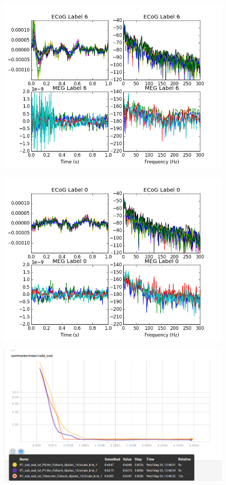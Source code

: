 \documentclass[journal,12pt,onecolumn,draftclsnofoot]{IEEEtran}
\begin{document}
\begin{figure}[h!]
\centering
\includegraphics[width=5in]{finalplots/rat5dbpink}
\caption{}
\label{fig:rat5dbpink}
\end{figure}

\begin{figure}[h!]
\centering
\includegraphics[width=5in]{finalplots/rat-120dbpink}
\caption{}
\label{fig:rat-120dbpink}
\end{figure}


\begin{figure}[h!]
\centering
\includegraphics[width=5in]{finalplots/train_real_test_real_valid}
\caption{}
\label{fig:realreal}
\end{figure}
\end{document}
